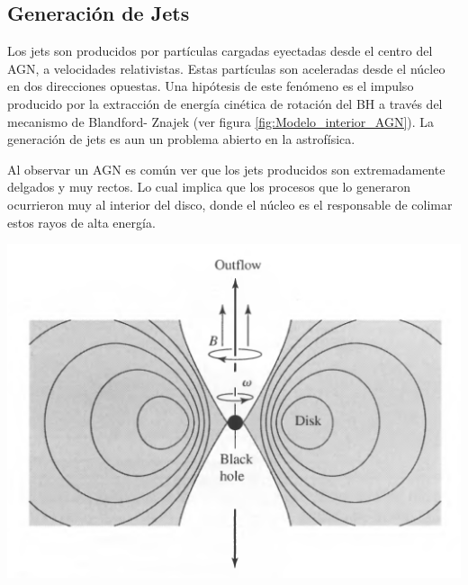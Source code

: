 	\subsection{Generación de Jets}
	\label{subsec:Generation_Jets}

Los jets son producidos por partículas cargadas eyectadas desde el centro del AGN, a velocidades relativistas. Estas partículas son aceleradas desde el núcleo en dos direcciones opuestas. Una hipótesis de este fenómeno es el impulso producido por la extracción de energía cinética de rotación del BH a través del mecanismo de Blandford- Znajek \cite{blandford1977} (ver figura  \ref{fig:Modelo_interior_AGN}). La generación de jets es aun un problema abierto en la astrofísica.%

Al observar un AGN es común ver que los jets producidos son extremadamente delgados y muy rectos. Lo cual implica  que los procesos que lo generaron ocurrieron muy al interior del disco, donde el núcleo es el responsable de colimar estos rayos de alta energía. %
%
\begin{center}
\includegraphics[scale=.5]{./figures/3_AGNs/Jets.png}
\label{fig:Modelo_interior_AGN}
\end{center}

